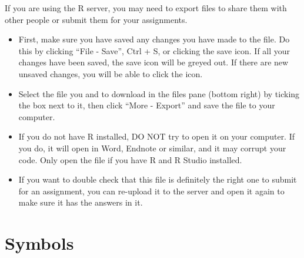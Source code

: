 \documentclass[
  oneside]{book}
\providecommand{\tightlist}{%
  \setlength{\itemsep}{0pt}\setlength{\parskip}{0pt}}
\begin{document}
If you are using the R server, you may need to export files to share them with other people or submit them for your assignments.

\begin{itemize}
\tightlist
\item
  First, make sure you have saved any changes you have made to the file. Do this by clicking ``File - Save'', Ctrl + S, or clicking the save icon. If all your changes have been saved, the save icon will be greyed out. If there are new unsaved changes, you will be able to click the icon.
\item
  Select the file you and to download in the files pane (bottom right) by ticking the box next to it, then click ``More - Export'' and save the file to your computer.
\item
  If you do not have R installed, DO NOT try to open it on your computer. If you do, it will open in Word, Endnote or similar, and it may corrupt your code. Only open the file if you have R and R Studio installed.
\item
  If you want to double check that this file is definitely the right one to submit for an assignment, you can re-upload it to the server and open it again to make sure it has the answers in it.
\end{itemize}

\hypertarget{symbols}{%
\chapter{Symbols}\label{symbols}}
\end{document}
